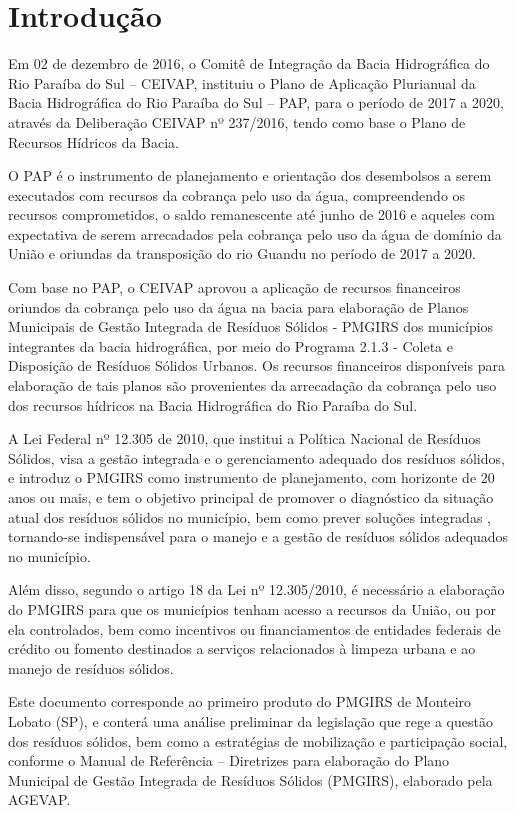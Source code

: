 \section{Introdução}

Em 02 de dezembro de 2016, o Comitê de Integração da Bacia Hidrográfica do Rio Paraíba do Sul – CEIVAP, instituiu o Plano de Aplicação Plurianual da Bacia Hidrográfica do Rio Paraíba do Sul – PAP, para o período de 2017 a 2020, através da Deliberação CEIVAP nº 237/2016, tendo como base o Plano de Recursos Hídricos da Bacia.

O PAP é o instrumento de planejamento e orientação dos desembolsos a serem executados com recursos da cobrança pelo uso da água, compreendendo os recursos comprometidos, o saldo remanescente até junho de 2016 e aqueles com expectativa de serem arrecadados pela cobrança pelo uso da água de domínio da União e oriundas da transposição do rio Guandu no período de 2017 a 2020.

Com base no PAP, o CEIVAP aprovou a aplicação de recursos financeiros oriundos da cobrança pelo uso da água na bacia para elaboração de Planos Municipais de Gestão Integrada de Resíduos Sólidos - PMGIRS dos municípios integrantes da bacia hidrográfica, por meio do Programa 2.1.3 - Coleta e Disposição de Resíduos Sólidos Urbanos. Os recursos financeiros disponíveis para elaboração de tais planos são provenientes da arrecadação da cobrança pelo uso dos recursos hídricos na Bacia Hidrográfica do Rio Paraíba do Sul.

A Lei Federal nº 12.305 de 2010, que institui a Política Nacional de Resíduos Sólidos, visa a gestão integrada e o gerenciamento adequado dos resíduos sólidos, e introduz o PMGIRS como instrumento de planejamento, com horizonte de 20 anos ou mais, e tem o objetivo principal de promover o diagnóstico da situação atual dos resíduos sólidos no município, bem como prever soluções integradas  \cite{Brasil2010}, tornando-se indispensável para o manejo e a gestão de resíduos sólidos adequados no município.

Além disso, segundo o artigo 18 da Lei nº 12.305/2010, é necessário a elaboração do PMGIRS para que os municípios tenham acesso a recursos da União, ou por ela controlados, bem como incentivos ou financiamentos de entidades federais de crédito ou fomento destinados a serviços relacionados à limpeza urbana e ao manejo de resíduos sólidos.

Este documento corresponde ao primeiro produto do PMGIRS de Monteiro Lobato (SP), e conterá uma análise preliminar da legislação que rege a questão dos resíduos sólidos, bem como a estratégias de mobilização e participação social, conforme o Manual de Referência – Diretrizes para elaboração do Plano Municipal de Gestão Integrada de Resíduos Sólidos (PMGIRS), elaborado pela AGEVAP.

